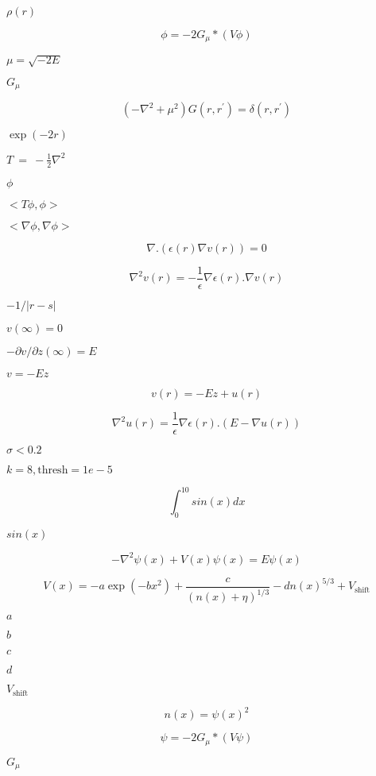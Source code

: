 \documentclass{article}
\begin{document}
$ \rho(r) $
\pagebreak

\[
    \phi = - 2 G_{\mu} * ( V \phi)
\]
\pagebreak

$ \mu = \sqrt{-2E} $
\pagebreak

$G_{\mu}$
\pagebreak

\[
    \left( - \nabla^2 + \mu^2  \right) G(r,r^{\prime}) = \delta(r,r^{\prime})
\]
\pagebreak

$ \exp(-2r) $
\pagebreak

$T~=~-\frac{1}{2}
\nabla^2 $
\pagebreak

$ \phi $
\pagebreak

$ <T \phi, \phi >
$
\pagebreak

$ < \nabla \phi, \nabla \phi >
$
\pagebreak

\[
\nabla . \left( \epsilon(r) \nabla v(r)  \right) = 0
\]
\pagebreak

\[
   \nabla^2 v(r) = - \frac{1}{\epsilon} \nabla \epsilon(r) .  \nabla v(r)
\]
\pagebreak

$-1 / |r-s|$
\pagebreak

$v(\infty)=0$
\pagebreak

$- \partial v / \partial z(\infty) = E$
\pagebreak

$v = - E z$
\pagebreak

\[
v(r) = - E z + u(r)
\]
\pagebreak

\[
   \nabla^2 u(r) = \frac{1}{\epsilon} \nabla \epsilon(r) .  \left(E - \nabla u(r) \right)
\]
\pagebreak

$\sigma<0.2$
\pagebreak

$k=8, \mbox{thresh}=1e-5$
\pagebreak

\[
   \int_0^{10} sin(x) dx
\]
\pagebreak

$ sin(x) $
\pagebreak

\[
-\nabla^2 \psi(x) + V(x) \psi(x) = E \psi(x)
\]
\pagebreak

\[
V(x) = -a \exp(-b x^2) + \frac{c}{(n(x)+\eta)^{1/3}} - d n(x)^{5/3} + V_{\mbox{shift}}
\]
\pagebreak

$ a $
\pagebreak

$ b $
\pagebreak

$ c $
\pagebreak

$ d $
\pagebreak

$ V_{\mbox{shift}} $
\pagebreak

\[
n(x) = \psi(x)^2
\]
\pagebreak

\[
   \psi = - 2 G_{\mu} * \left ( V \psi \right)
\]
\pagebreak

$ G_{\mu}$
\pagebreak
\end{document}
